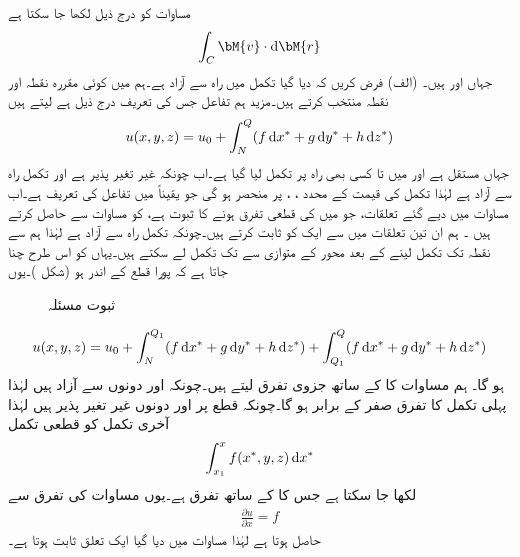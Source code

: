 مساوات  کو درج ذیل لکھا جا سکتا ہے
\begin{align}
\int_C \bM{v}\cdot \dif \bM{r}
\end{align}
جہاں  اور  ہیں۔
(الف) فرض کریں کہ دیا گیا تکمل  میں راہ  سے آزاد ہے۔ہم   میں کوئی مقررہ نقطہ  اور نقطہ  منتخب کرتے ہیں۔مزید ہم تفاعل  جس کی تعریف درج ذیل ہے لیتے ہیں
\begin{align}\label{مساوات_خطی_تکمل_آزادی_راہ_ثبوت_الف}
u(x,y,z)=u_0+\int_N^Q (f\dif x^*+g\dif y^*+h\dif z^*)
\end{align}
جہاں  مستقل ہے اور  میں  تا  کسی بھی راہ پر تکمل لیا گیا ہے۔اب چونکہ  غیر تغیر پذیر ہے اور تکمل راہ سے آزاد ہے لہٰذا تکمل کی قیمت  کے  محدد ، ،  پر منحصر ہو گی جو یقیناً  میں تفاعل   کی تعریف ہے۔اب   مساوات  میں دیے گئے تعلقات، جو  میں  کی قطعی تفرق ہونے کا ثبوت ہے،  کو مساوات  سے  حاصل کرتے ہیں ۔ ہم ان تین تعلقات  میں سے ایک کو ثابت کرتے ہیں۔چونکہ تکمل راہ سے آزاد ہے لہٰذا ہم  سے نقطہ  تک تکمل لینے کے بعد  محور کے متوازی  سے  تک تکمل لے سکتے ہیں۔یہاں  کو اس طرح چنا جاتا ہے کہ پورا  قطع  کے اندر ہو (شکل )۔یوں 
\begin{figure}
\centering
{}
\caption{ثبوت مسئلہ }
\label{شکل_مسئلہ_خطی_تکمل_آزادی_راہ}
\end{figure}
%
\begin{align}\label{مساوات_خطی_تکمل_آزادی_راہ_ثبوت_ب}
u(x,y,z)=u_0+\int_N^{Q_1}(f\dif x^*+g\dif y^*+h\dif z^*)+\int_{Q_1}^Q(f\dif x^*+g\dif y^*+h\dif z^*)
\end{align}
ہو گا۔ ہم مساوات  کا  کے ساتھ جزوی تفرق لیتے ہیں۔چونکہ  اور  دونوں  سے آزاد ہیں لہٰذا پہلی تکمل کا تفرق صفر کے برابر ہو گا۔چونکہ قطع  پر  اور  دونوں غیر تغیر پذیر ہیں لہٰذا آخری تکمل کو قطعی تکمل
\begin{align*}
\int_{x_1}^{x}f(x^*,y,z)\dif x^*
\end{align*}
لکھا جا سکتا ہے جس کا  کے ساتھ تفرق  ہے۔یوں مساوات  کی تفرق سے
\begin{align*}
\frac{\partial u}{\partial x}=f
\end{align*}
 حاصل ہوتا ہے لہٰذا مساوات  میں دیا گیا ایک تعلق ثابت ہوتا ہے۔

